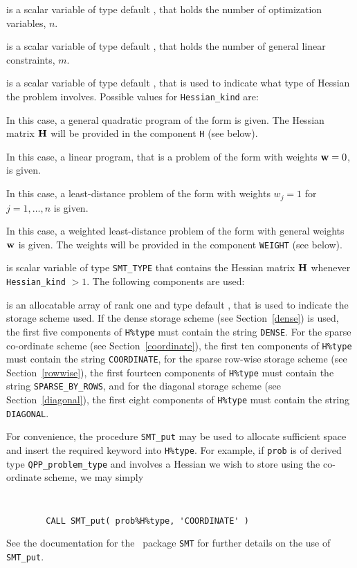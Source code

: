 \documentclass{galahad}
\newcommand{\packagename}{QPP}
\begin{document}
\begin{description}

 is a scalar variable of type default \integer,
 that holds the number of optimization variables, $n$.

 is a scalar variable of type default \integer,
 that holds the number of general linear constraints, $m$.

 is a scalar variable of type default \integer,
that is used to indicate what type of Hessian the problem involves.
Possible values for {\tt Hessian\_kind} are:

\begin{description}
  In this case, a general quadratic program of the form
 is given. The Hessian matrix ${\mathbf{H}}$ will be provided in the
component {\tt H} (see below).

  In this case, a linear program, that is a problem of the form
 with weights ${\mathbf{w}} = 0$, is given.

 In this case, a least-distance problem of the form 
with weights $w_{j} = 1$ for $j = 1, \ldots , n$ is given.

 In this case, a weighted least-distance problem of the form 
with general weights ${\mathbf{w}}$ is given. The weights will be
provided in the component {\tt WEIGHT} (see below).
\end{description}

 is scalar variable of type {\tt SMT\_TYPE}
that contains the Hessian matrix ${\mathbf{H}}$ whenever {\tt Hessian\_kind} $>1$.
The following components are used:

\begin{description}

 is an allocatable array of rank one and type default \character,
that is used to indicate the storage scheme used. If the dense storage scheme
(see Section~\ref{dense}) is used,
the first five components of {\tt H\%type} must contain the
string {\tt DENSE}.
For the sparse co-ordinate scheme (see Section~\ref{coordinate}),
the first ten components of {\tt H\%type} must contain the
string {\tt COORDINATE},
for the sparse row-wise storage scheme (see Section~\ref{rowwise}),
the first fourteen components of {\tt H\%type} must contain the
string {\tt SPARSE\_BY\_ROWS},
and for the diagonal storage scheme (see Section~\ref{diagonal}),
the first eight components of {\tt H\%type} must contain the
string {\tt DIAGONAL}.

For convenience, the procedure {\tt SMT\_put}
may be used to allocate sufficient space and insert the required keyword
into {\tt H\%type}.
For example, if {\tt prob} is of derived type {\tt \packagename\_problem\_type}
and involves a Hessian we wish to store using the co-ordinate scheme,
we may simply
{\tt
\begin{verbatim}
        CALL SMT_put( prob%H%type, 'COORDINATE' )
\end{verbatim}
}
\noindent
See the documentation for the \galahad\ package {\tt SMT}
for further details on the use of {\tt SMT\_put}.


\end{description}
\end{description}
\end{document}
